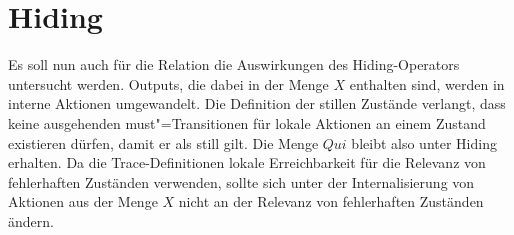 \section{Hiding}

Es soll nun auch für die Relation \QRel{} die Auswirkungen des Hiding-Operators
untersucht werden. Outputs, die dabei in der Menge $X$ enthalten sind, werden
in interne Aktionen umgewandelt. Die Definition der stillen Zustände verlangt,
dass keine ausgehenden must"=Transitionen für lokale Aktionen an einem Zustand
existieren dürfen, damit er als still gilt. Die Menge $Qui$ bleibt also unter
Hiding erhalten. Da die Trace-Definitionen lokale Erreichbarkeit für die
Relevanz von fehlerhaften Zuständen verwenden, sollte sich unter der
Internalisierung von Aktionen aus der Menge $X$ nicht an der Relevanz von
fehlerhaften Zuständen ändern.

